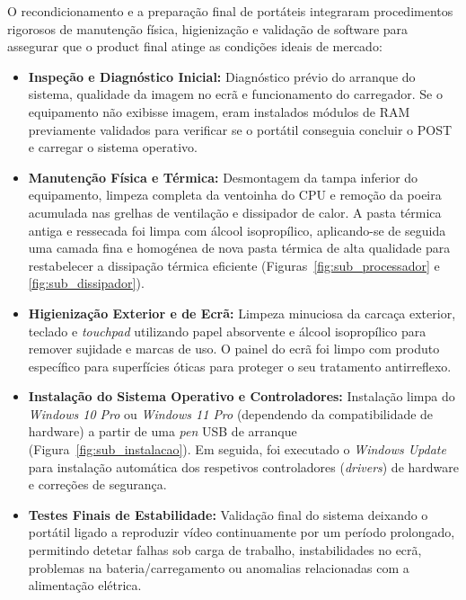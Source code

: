 O recondicionamento e a preparação final de portáteis integraram procedimentos rigorosos de manutenção física, higienização e validação de software para assegurar que o product final atinge as condições ideais de mercado:
\begin{itemize}
    \item \textbf{Inspeção e Diagnóstico Inicial:} Diagnóstico prévio do arranque do sistema, qualidade da imagem no ecrã e funcionamento do carregador. Se o equipamento não exibisse imagem, eram instalados módulos de RAM previamente validados para verificar se o portátil conseguia concluir o POST e carregar o sistema operativo.
    \item \textbf{Manutenção Física e Térmica:} Desmontagem da tampa inferior do equipamento, limpeza completa da ventoinha do CPU e remoção da poeira acumulada nas grelhas de ventilação e dissipador de calor. A pasta térmica antiga e ressecada foi limpa com álcool isopropílico, aplicando-se de seguida uma camada fina e homogénea de nova pasta térmica de alta qualidade para restabelecer a dissipação térmica eficiente (Figuras~\ref{fig:sub_processador} e \ref{fig:sub_dissipador}).
    \item \textbf{Higienização Exterior e de Ecrã:} Limpeza minuciosa da carcaça exterior, teclado e \textit{touchpad} utilizando papel absorvente e álcool isopropílico para remover sujidade e marcas de uso. O painel do ecrã foi limpo com produto específico para superfícies óticas para proteger o seu tratamento antirreflexo.
    \item \textbf{Instalação do Sistema Operativo e Controladores:} Instalação limpa do \textit{Windows 10 Pro} ou \textit{Windows 11 Pro} (dependendo da compatibilidade de hardware) a partir de uma \textit{pen} USB de arranque (Figura~\ref{fig:sub_instalacao}). Em seguida, foi executado o \textit{Windows Update} para instalação automática dos respetivos controladores (\textit{drivers}) de hardware e correções de segurança.
    \item \textbf{Testes Finais de Estabilidade:} Validação final do sistema deixando o portátil ligado a reproduzir vídeo continuamente por um período prolongado, permitindo detetar falhas sob carga de trabalho, instabilidades no ecrã, problemas na bateria/carregamento ou anomalias relacionadas com a alimentação elétrica.
\end{itemize}

